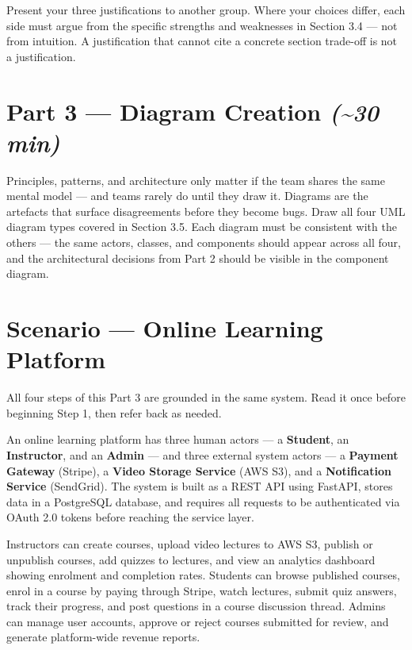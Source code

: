 \documentclass[11pt,a4paper]{book}
\begin{document}
Present your three justifications to another group. Where your choices differ, each side must argue from the specific strengths and weaknesses in Section 3.4 --- not from intuition. A justification that cannot cite a concrete section trade-off is not a justification.

\medskip

\section{Part 3 --- Diagram Creation \textit{(\textasciitilde{}30 min)}}

Principles, patterns, and architecture only matter if the team shares the same mental model --- and teams rarely do until they draw it. Diagrams are the artefacts that surface disagreements before they become bugs. Draw all four UML diagram types covered in Section 3.5. Each diagram must be consistent with the others --- the same actors, classes, and components should appear across all four, and the architectural decisions from Part 2 should be visible in the component diagram.

\medskip

\section{Scenario --- Online Learning Platform}

All four steps of this Part 3 are grounded in the same system. Read it once before beginning Step 1, then refer back as needed.

An online learning platform has three human actors --- a \textbf{Student}, an \textbf{Instructor}, and an \textbf{Admin} --- and three external system actors --- a \textbf{Payment Gateway} (Stripe), a \textbf{Video Storage Service} (AWS S3), and a \textbf{Notification Service} (SendGrid). The system is built as a REST API using FastAPI, stores data in a PostgreSQL database, and requires all requests to be authenticated via OAuth 2.0 tokens before reaching the service layer.

Instructors can create courses, upload video lectures to AWS S3, publish or unpublish courses, add quizzes to lectures, and view an analytics dashboard showing enrolment and completion rates. Students can browse published courses, enrol in a course by paying through Stripe, watch lectures, submit quiz answers, track their progress, and post questions in a course discussion thread. Admins can manage user accounts, approve or reject courses submitted for review, and generate platform-wide revenue reports.
\end{document}
